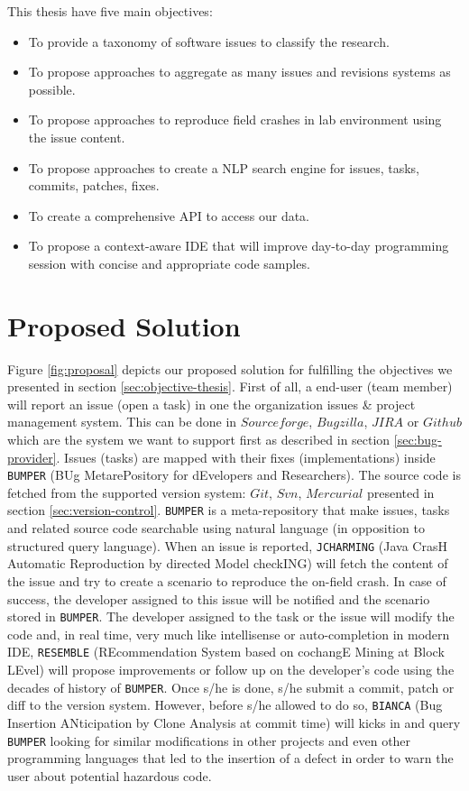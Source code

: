 This thesis have five main objectives:

\begin{itemize}
	\item To provide a taxonomy of software issues to classify the research.
	\item To propose approaches to aggregate as many issues and revisions systems as possible.
	\item To propose approaches to reproduce field crashes in lab environment using the issue content.
	\item To propose approaches to create a NLP search engine for issues, tasks, commits, patches, fixes.
	\item To create a comprehensive API to access our data.
	\item To propose a context-aware IDE that will improve day-to-day programming session with concise and appropriate code samples.
\end{itemize}

\section{Proposed Solution \label{sec:solution}}

Figure \ref{fig:proposal} depicts our proposed solution for fulfilling the objectives we presented in section \ref{sec:objective-thesis}. 
First of all, a end-user (team member) will report an issue (open a task) in one the organization issues \& project management system. This can be done in $Sourceforge$, $Bugzilla$, $JIRA$ or $Github$ which are the system we want to support first as described in section \ref{sec:bug-provider}.
Issues (tasks) are  mapped with their fixes (implementations) inside {\tt BUMPER} (BUg MetarePository for dEvelopers and Researchers). The source code is fetched from the supported version system: $Git$, $Svn$, $Mercurial$ presented in section \ref{sec:version-control}.  
{\tt BUMPER} is a meta-repository that make issues, tasks and related source code searchable using natural language  (in opposition to structured query language). 
When an issue is reported, {\tt JCHARMING} (Java CrasH Automatic Reproduction by directed Model checkING) will fetch the content of the issue and try to create a scenario to reproduce the on-field crash. In case of success, the developer assigned to this issue will be notified and the scenario stored in {\tt BUMPER}. 
The developer assigned to the task or the issue will modify the code and, in real time, very much like intellisense or auto-completion in modern IDE, {\tt RESEMBLE} (REcommendation System based on cochangE Mining at Block LEvel) will propose improvements or follow up on the developer's code using the decades of history of {\tt BUMPER}. Once s/he is done, s/he submit a commit, patch or diff to the version system. 
However, before s/he allowed to do so, {\tt BIANCA} (Bug Insertion ANticipation by Clone Analysis at commit time) will kicks in and query {\tt BUMPER} looking for similar modifications in other projects and even other programming languages that led to the insertion of a defect in order to warn the user about potential hazardous code.


